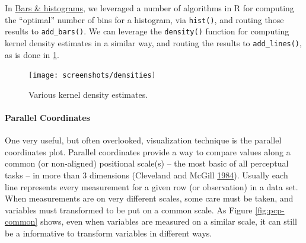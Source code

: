 \documentclass[12pt,]{isuthesis}
\newenvironment{Shaded}{\begin{snugshade}}{\end{snugshade}}
\newcommand{\KeywordTok}[1]{\textcolor[rgb]{0.13,0.29,0.53}{\textbf{{#1}}}}
\newcommand{\DataTypeTok}[1]{\textcolor[rgb]{0.13,0.29,0.53}{{#1}}}
\newcommand{\StringTok}[1]{\textcolor[rgb]{0.31,0.60,0.02}{{#1}}}
\newcommand{\OtherTok}[1]{\textcolor[rgb]{0.56,0.35,0.01}{{#1}}}
\newcommand{\NormalTok}[1]{{#1}}
\let\oldparagraph\paragraph
\renewcommand{\paragraph}[1]{\oldparagraph{#1}\mbox{}}
\begin{document}
In \protect\hyperlink{bars-histograms}{Bars \& histograms}, we leveraged
a number of algorithms in R for computing the ``optimal'' number of bins
for a histogram, via \texttt{hist()}, and routing those results to
\texttt{add\_bars()}. We can leverage the \texttt{density()} function
for computing kernel density estimates in a similar way, and routing the
results to \texttt{add\_lines()}, as is done in \ref{fig:densities}.

\begin{Shaded}
\end{Shaded}

\begin{figure}
\centering
\texttt{[image: screenshots/densities]}
\caption{\label{fig:densities}Various kernel density estimates.}
\end{figure}

\paragraph{Parallel Coordinates}\label{parallel-coordinates}

One very useful, but often overlooked, visualization technique is the
parallel coordinates plot. Parallel coordinates provide a way to compare
values along a common (or non-aligned) positional scale(s) -- the most
basic of all perceptual tasks -- in more than 3 dimensions (Cleveland
and McGill \protect\hyperlink{ref-graphical-perception}{1984}). Usually
each line represents every measurement for a given row (or observation)
in a data set. When measurements are on very different scales, some care
must be taken, and variables must transformed to be put on a common
scale. As Figure \ref{fig:pcp-common} shows, even when variables are
measured on a similar scale, it can still be a informative to transform
variables in different ways.
\end{document}
